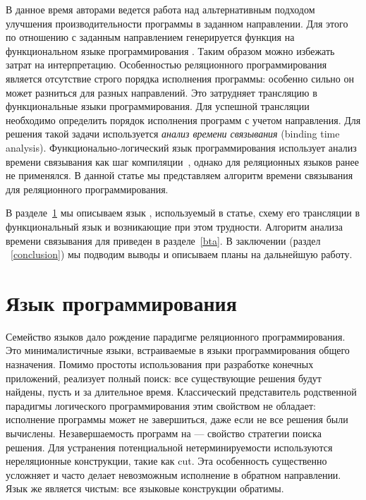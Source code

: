 \documentclass[conference]{IEEEtran}
\begin{document}
В данное время авторами ведется работа над альтернативным подходом улучшения производительности программы в заданном направлении. 
Для этого по отношению с заданным направлением генерируется функция на функциональном языке программирования \haskell{}. 
Таким образом можно избежать затрат на интерпретацию. 
Особенностью реляционного программирования является отсутствие строго порядка исполнения программы: особенно сильно он может разниться для разных направлений.
Это затрудняет трансляцию в функциональные языки программирования. 
Для успешной трансляции необходимо определить порядок исполнения программ с учетом направления. 
Для решения такой задачи используется \emph{анализ времени связывания} (binding time analysis). 
Функционально-логический язык программирования \mercury использует анализ времени связывания как шаг компиляции~\cite{vanhoof2004binding}, однако для реляционных языков ранее не применялся.
В данной статье мы представляем алгоритм времени связывания для реляционного программирования. 

В разделе~\ref{miniKanren} мы описываем язык \miniKanren{}, используемый в статье, схему его трансляции в функциональный язык и возникающие при этом трудности. 
Алгоритм анализа времени связывания для \miniKanren{} приведен в разделе~\ref{bta}. 
В заключении (раздел ~\ref{conclusion}) мы подводим выводы и описываем планы на дальнейшую работу. 

\section{Язык программирования \miniKanren{}}\label{miniKanren}

Семейство языков \miniKanren{} дало рождение парадигме реляционного программирования. 
Это минималистичные языки, встраиваемые в языки программирования общего назначения. 
Помимо простоты использования при разработке конечных приложений, \miniKanren{} реализует полный поиск: все существующие решения будут найдены, пусть и за длительное время.
Классический представитель родственной парадигмы логического программирования \prolog{} этим свойством не обладает: исполнение программы может не завершиться, даже если не все решения были вычислены. 
Незавершаемость программ на \prolog{} --- свойство стратегии поиска решения.
Для устранения потенциальной нетерминируемости используются нереляционные конструкции, такие как cut. 
Эта особенность существенно усложняет и часто делает невозможным исполнение в обратном направлении. 
Язык \miniKanren{} же является чистым: все языковые конструкции обратимы. 
\end{document}

